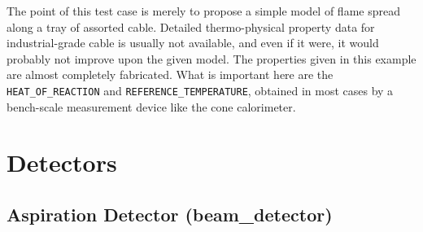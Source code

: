 \documentclass[11pt]{book}
\newcommand{\ct}{\tt\small}
\begin{document}
The point of this test case is merely to propose a simple model of flame spread along a tray of assorted cable. Detailed thermo-physical property data for
industrial-grade cable is usually not available, and even if it were, it would probably not improve upon the given model. The properties given in this example
are almost completely fabricated. What is important here are the
{\ct HEAT\_OF\_REACTION} and {\ct REFERENCE\_TEMPERATURE}, obtained in most cases by a bench-scale measurement device like the cone calorimeter.






\clearpage

\section{Detectors}

\subsection{Aspiration Detector ({\bf beam\_detector}) }
\label{beam_detectors}
\end{document}
